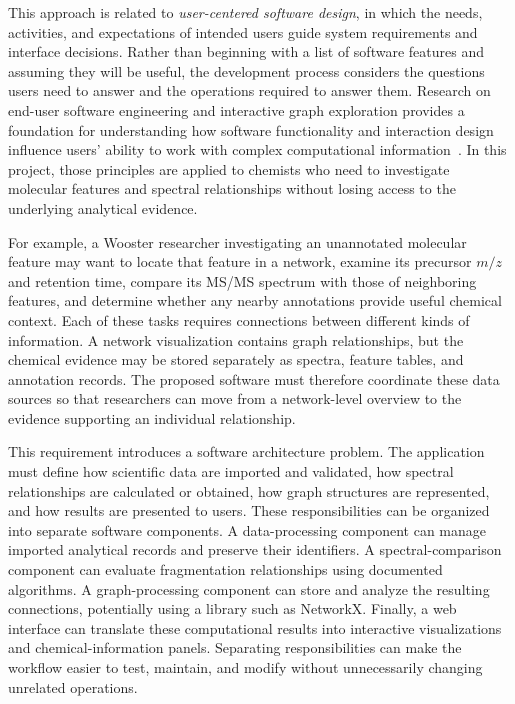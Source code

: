         This approach is related to \emph{user-centered software design}, in which the needs, activities, and expectations of intended users guide system requirements and interface decisions. Rather than beginning with a list of software features and assuming they will be useful, the development process considers the questions users need to answer and the operations required to answer them. Research on end-user software engineering and interactive graph exploration provides a foundation for understanding how software functionality and interaction design influence users' ability to work with complex computational information~\cite{Ko2011,Pienta2015}. In this project, those principles are applied to chemists who need to investigate molecular features and spectral relationships without losing access to the underlying analytical evidence.

        For example, a Wooster researcher investigating an unannotated molecular feature may want to locate that feature in a network, examine its precursor $m/z$ and retention time, compare its MS/MS spectrum with those of neighboring features, and determine whether any nearby annotations provide useful chemical context. Each of these tasks requires connections between different kinds of information. A network visualization contains graph relationships, but the chemical evidence may be stored separately as spectra, feature tables, and annotation records. The proposed software must therefore coordinate these data sources so that researchers can move from a network-level overview to the evidence supporting an individual relationship.

        This requirement introduces a software architecture problem. The application must define how scientific data are imported and validated, how spectral relationships are calculated or obtained, how graph structures are represented, and how results are presented to users. These responsibilities can be organized into separate software components. A data-processing component can manage imported analytical records and preserve their identifiers. A spectral-comparison component can evaluate fragmentation relationships using documented algorithms. A graph-processing component can store and analyze the resulting connections, potentially using a library such as NetworkX. Finally, a web interface can translate these computational results into interactive visualizations and chemical-information panels. Separating responsibilities can make the workflow easier to test, maintain, and modify without unnecessarily changing unrelated operations.

